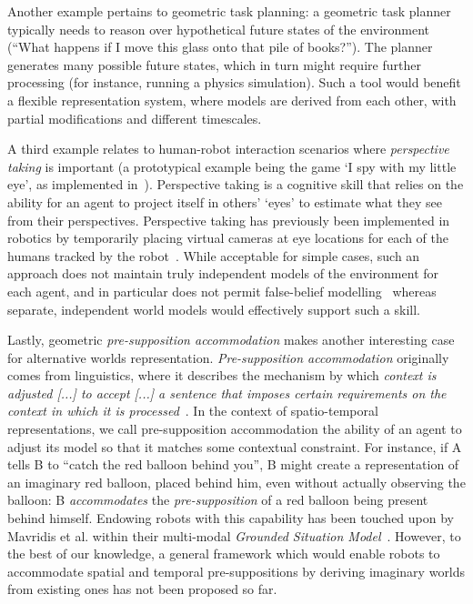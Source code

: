 \documentclass[conference]{IEEEtran}
\newcommand{\etal}{et al.\xspace}
\begin{document}
Another example pertains to geometric task planning: a geometric task planner
typically needs to reason over hypothetical future states of the environment
(``What happens if I move this glass onto that pile of books?'').  The planner
generates many possible future states, which in turn might require further
processing (for instance, running a physics simulation). Such a tool would
benefit a flexible representation system, where models are derived from each
other, with partial modifications and different timescales.

A third example relates to human-robot interaction scenarios where \emph{perspective
taking} is important (a prototypical example being the game `I spy with my
little eye', as implemented in~\cite{ros2010which}). Perspective taking is a
cognitive skill that relies on the ability for an agent to project itself in
others' `eyes' to estimate what they see from their perspectives. 
Perspective taking has previously been implemented in robotics by temporarily placing
virtual cameras at eye locations for each of the humans tracked by the
robot~\cite{ros2010solving}. While acceptable for simple cases, such an approach
does not maintain truly independent models of the environment for each
agent, and in particular does not permit false-belief
modelling~\cite{lemaignan2015mutual} whereas separate, independent world models
would effectively support such a skill.

Lastly, geometric \emph{pre-supposition accommodation} makes another interesting
case for alternative worlds representation. \emph{Pre-supposition accommodation}
originally comes from linguistics, where it describes the mechanism by which
\emph{context is adjusted [...] to accept [...] a sentence that imposes certain
requirements on the context in which it is
processed}~\cite{vonfintel2008presupposition}. In the context of spatio-temporal
representations, we call pre-supposition accommodation the ability of an agent
to adjust its model so that it matches some contextual constraint. For instance,
if A tells B to ``catch the red balloon behind you'', B might create a
representation of an imaginary red balloon, placed behind him, even without
actually observing the balloon: B \emph{accommodates} the \emph{pre-supposition}
of a red balloon being present behind himself. Endowing robots with this
capability has been touched upon by Mavridis \etal within their multi-modal
\emph{Grounded Situation Model}~\cite{Mavridis2006}. However, to the best of our
knowledge, a general framework which would enable robots to accommodate spatial
and temporal pre-suppositions by deriving imaginary worlds from existing ones
has not been proposed so far.
\end{document}
